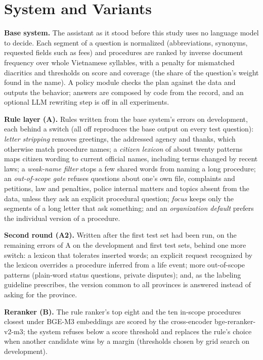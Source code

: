 \section{System and Variants}\label{sec:method}

\textbf{Base system.} The assistant as it stood before this study uses no language model to decide. Each segment of a question is
normalized (abbreviations, synonyms, requested fields such as fees) and procedures are ranked by inverse document frequency over whole
Vietnamese syllables, with a penalty for mismatched diacritics and thresholds on score and coverage (the share of the
question's weight found in the name). A policy module checks the plan against the data and outputs the behavior; answers are composed by
code from the record, and an optional LLM rewriting step is off in all experiments.

\textbf{Rule layer (A).} Rules written from the base system's errors on development, each behind a switch (all off reproduces the base
output on every test question): \emph{letter stripping} removes greetings, the addressed agency and thanks, which otherwise match procedure
names; a \emph{citizen lexicon} of about twenty patterns maps citizen wording to current official names, including terms changed by recent
laws; a \emph{weak-name filter} stops a few shared words from
naming a long procedure; an \emph{out-of-scope gate} refuses questions about one's own file, complaints and petitions, law and penalties,
police internal matters and topics absent from the data, unless they ask an explicit procedural question; \emph{focus} keeps only the
segments of a long letter that ask something; and an \emph{organization default} prefers the individual version of a procedure.

\textbf{Second round (A2).} Written after the first test set had been run, on the remaining errors of A on the development and first test
sets, behind one more switch: a lexicon that tolerates inserted words; an explicit request recognized by the lexicon overrides a procedure
inferred from a life event; more
out-of-scope patterns (plain-word status questions, private disputes); and, as the labeling
guideline prescribes, the version common to all provinces is answered instead of asking for the province.

\textbf{Reranker (B).} The rule ranker's top eight and the ten in-scope procedures closest under BGE-M3 embeddings\cite{chen2024m3} are scored by the
cross-encoder bge-reranker-v2-m3\cite{bgererank}; the system refuses below a score threshold and replaces the rule's choice when another
candidate wins by a margin (thresholds chosen by grid search on development).

